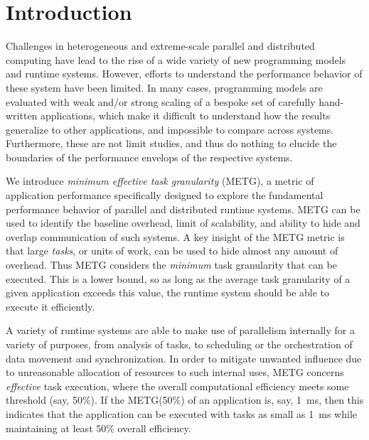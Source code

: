 \section{Introduction}
\label{sec:introduction}

Challenges in heterogeneous and extreme-scale parallel and distributed
computing have lead to the rise of a wide variety of new programming
models and runtime systems. However, efforts to understand the
performance behavior of these system have been limited. In many cases,
programming models are evaluated with weak and/or strong scaling of a
bespoke set of carefully hand-written applications, which make it
difficult to understand how the results generalize to other
applications, and impossible to compare across systems. Furthermore,
these are not limit studies, and thus do nothing to elucide the
boundaries of the performance envelops of the respective systems.

We introduce \emph{minimum effective task granularity} (METG), a
metric of application performance specifically designed to explore the
fundamental performance behavior of parallel and distributed runtime
systems. METG can be used to identify the baseline overhead, limit of
scalability, and ability to hide and overlap communication of such
systems. A key insight of the METG metric is that large \emph{tasks},
or units of work, can be used to hide almost any amount of
overhead. Thus METG considers the \emph{minimum} task granularity that
can be executed. This is a lower bound, so as long as the average task
granularity of a given application exceeds this value, the runtime
system should be able to execute it efficiently.

A variety of runtime systems are able to make use of parallelism
internally for a variety of purposes, from analysis of tasks, to
scheduling or the orchestration of data movement and
synchronization. In order to mitigate unwanted influence due to
unreasonable allocation of resources to such internal uses, METG
concerns \emph{effective} task execution, where the overall
computational efficiency meets some threshold (say, 50\%). If the
METG(50\%) of an application is, say, 1~ms, then this indicates that
the application can be executed with tasks as small as 1~ms while
maintaining at least 50\% overall efficiency.

